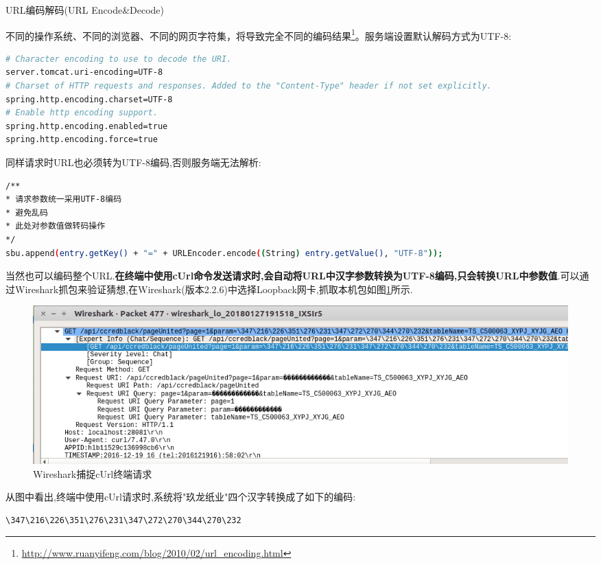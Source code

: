 \documentclass[12pt]{book}
\makeatletter
\numberwithin{dummy}{section}
\theoremstyle{ocrenumbox}
\theoremstyle{blacknumex}
\theoremstyle{blacknumbox}
\theoremstyle{ocrenum}
\renewcommand{\subsection}{\@startsection {subsection}{2}{\z@}
	{-3ex \@plus -0.1ex \@minus -.4ex}
	{0.5ex \@plus.2ex }
	{\normalfont\sffamily\bfseries}}
\newlength\esp
\makeatother
\begin{document}
\subsection{URL编码解码(URL Encode\&Decode)}

不同的操作系统、不同的浏览器、不同的网页字符集，将导致完全不同的编码结果\footnote{\url{http://www.ruanyifeng.com/blog/2010/02/url_encoding.html}}。服务端设置默认解码方式为UTF-8:

\begin{lstlisting}[language=Bash]
# Character encoding to use to decode the URI.
server.tomcat.uri-encoding=UTF-8
# Charset of HTTP requests and responses. Added to the "Content-Type" header if not set explicitly.
spring.http.encoding.charset=UTF-8 
# Enable http encoding support.
spring.http.encoding.enabled=true 
spring.http.encoding.force=true
\end{lstlisting}

同样请求时URL也必须转为UTF-8编码,否则服务端无法解析:

\begin{lstlisting}[language=Bash]
/**
* 请求参数统一采用UTF-8编码
* 避免乱码
* 此处对参数值做转码操作
*/
sbu.append(entry.getKey() + "=" + URLEncoder.encode((String) entry.getValue(), "UTF-8"));
\end{lstlisting}

当然也可以编码整个URL.\textbf{在终端中使用cUrl命令发送请求时,会自动将URL中汉字参数转换为UTF-8编码,只会转换URL中参数值}.可以通过Wireshark抓包来验证猜想,在Wireshark(版本2.2.6)中选择Loopback网卡,抓取本机包如图\ref{fig:wiresharkcapturecurlrequest}所示.

\begin{figure}[htbp]
	\centering
	\includegraphics[scale=0.4]{wiresharkcapturecurlrequest.png}
	\caption{Wireshark捕捉cUrl终端请求}
	\label{fig:wiresharkcapturecurlrequest}
\end{figure}

从图中看出,终端中使用cUrl请求时,系统将"玖龙纸业"四个汉字转换成了如下的编码:

\begin{lstlisting}
\347\216\226\351\276\231\347\272\270\344\270\232
\end{lstlisting}
\end{document}
